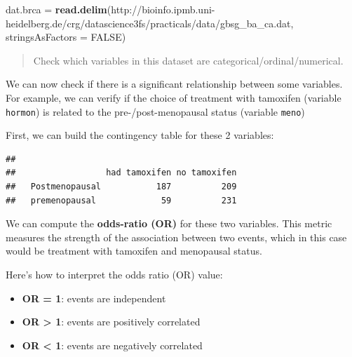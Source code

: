 \documentclass[
]{book}
\newenvironment{Shaded}{\begin{snugshade}}{\end{snugshade}}
\newcommand{\AttributeTok}[1]{\textcolor[rgb]{0.13,0.29,0.53}{#1}}
\newcommand{\ConstantTok}[1]{\textcolor[rgb]{0.56,0.35,0.01}{#1}}
\newcommand{\DocumentationTok}[1]{\textcolor[rgb]{0.56,0.35,0.01}{\textbf{\textit{#1}}}}
\newcommand{\FunctionTok}[1]{\textcolor[rgb]{0.13,0.29,0.53}{\textbf{#1}}}
\newcommand{\NormalTok}[1]{#1}
\newcommand{\OtherTok}[1]{\textcolor[rgb]{0.56,0.35,0.01}{#1}}
\newcommand{\SpecialCharTok}[1]{\textcolor[rgb]{0.81,0.36,0.00}{\textbf{#1}}}
\newcommand{\StringTok}[1]{\textcolor[rgb]{0.31,0.60,0.02}{#1}}
\providecommand{\tightlist}{%
  \setlength{\itemsep}{0pt}\setlength{\parskip}{0pt}}
\begin{document}
\begin{Shaded}
\begin{Highlighting}[]
\NormalTok{dat.brca }\OtherTok{=} \FunctionTok{read.delim}\NormalTok{(}\StringTok{\textquotesingle{}http://bioinfo.ipmb.uni{-}heidelberg.de/crg/datascience3fs/practicals/data/gbsg\_ba\_ca.dat\textquotesingle{}}\NormalTok{, }
                      \AttributeTok{stringsAsFactors =} \ConstantTok{FALSE}\NormalTok{)}
\end{Highlighting}
\end{Shaded}

\begin{quote}
Check which variables in this dataset are categorical/ordinal/numerical.
\end{quote}

We can now check if there is a significant relationship between some variables.
For example, we can verify if the choice of treatment with tamoxifen (variable \texttt{hormon}) is related to the pre-/post-menopausal status (variable \texttt{meno})

First, we can build the contingency table for these 2 variables:

\begin{Shaded}
\end{Shaded}

\begin{verbatim}
##                 
##                  had tamoxifen no tamoxifen
##   Postmenopausal           187          209
##   premenopausal             59          231
\end{verbatim}

We can compute the \textbf{odds-ratio (OR)} for these two variables.
This metric measures the strength of the association between two events, which in this case would be treatment with tamoxifen and menopausal status.

Here's how to interpret the odds ratio (OR) value:

\begin{itemize}
\tightlist
\item
  \textbf{OR = 1}: events are independent\\
\item
  \textbf{OR \textgreater{} 1}: events are positively correlated\\
\item
  \textbf{OR \textless{} 1}: events are negatively correlated
\end{itemize}
\end{document}
